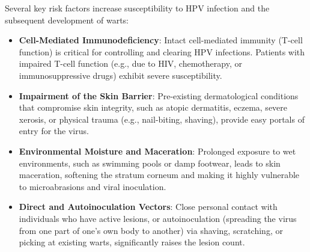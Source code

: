 Several key risk factors increase susceptibility to HPV infection and the subsequent development of warts:
\begin{itemize}
    \item \textbf{Cell-Mediated Immunodeficiency}: Intact cell-mediated immunity (T-cell function) is critical for controlling and clearing HPV infections. Patients with impaired T-cell function (e.g., due to HIV, chemotherapy, or immunosuppressive drugs) exhibit severe susceptibility.
    \item \textbf{Impairment of the Skin Barrier}: Pre-existing dermatological conditions that compromise skin integrity, such as atopic dermatitis, eczema, severe xerosis, or physical trauma (e.g., nail-biting, shaving), provide easy portals of entry for the virus.
    \item \textbf{Environmental Moisture and Maceration}: Prolonged exposure to wet environments, such as swimming pools or damp footwear, leads to skin maceration, softening the stratum corneum and making it highly vulnerable to microabrasions and viral inoculation.
    \item \textbf{Direct and Autoinoculation Vectors}: Close personal contact with individuals who have active lesions, or autoinoculation (spreading the virus from one part of one's own body to another) via shaving, scratching, or picking at existing warts, significantly raises the lesion count.
\end{itemize}

